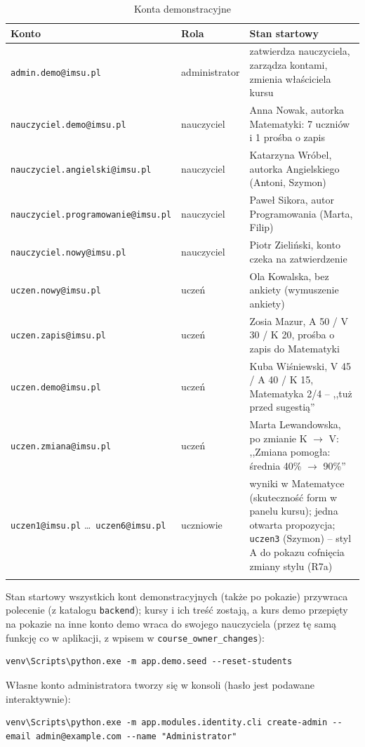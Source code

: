 \begingroup
\small
\begin{longtable}{|p{6.4cm}|p{2.4cm}|p{5.7cm}|}
\hline
\textbf{Konto} & \textbf{Rola} & \textbf{Stan startowy} \\ \hline
\endhead
\texttt{admin.demo@imsu.pl} & administrator & zatwierdza nauczyciela, zarządza kontami, zmienia właściciela kursu \\ \hline
\texttt{nauczyciel.demo@imsu.pl} & nauczyciel & Anna Nowak, autorka Matematyki: 7 uczniów i 1 prośba o zapis \\ \hline
\texttt{nauczyciel.angielski@imsu.pl} & nauczyciel & Katarzyna Wróbel, autorka Angielskiego (Antoni, Szymon) \\ \hline
\texttt{nauczyciel.programowanie@imsu.pl} & nauczyciel & Paweł Sikora, autor Programowania (Marta, Filip) \\ \hline
\texttt{nauczyciel.nowy@imsu.pl} & nauczyciel & Piotr Zieliński, konto czeka na zatwierdzenie \\ \hline
\texttt{uczen.nowy@imsu.pl} & uczeń & Ola Kowalska, bez ankiety (wymuszenie ankiety) \\ \hline
\texttt{uczen.zapis@imsu.pl} & uczeń & Zosia Mazur, A 50 / V 30 / K 20, prośba o zapis do Matematyki \\ \hline
\texttt{uczen.demo@imsu.pl} & uczeń & Kuba Wiśniewski, V 45 / A 40 / K 15, Matematyka 2/4 -- ,,tuż przed sugestią'' \\ \hline
\texttt{uczen.zmiana@imsu.pl} & uczeń & Marta Lewandowska, po zmianie K $\to$ V: ,,Zmiana pomogła: średnia 40\% $\to$ 90\%'' \\ \hline
\texttt{uczen1@imsu.pl} \ldots\ \texttt{uczen6@imsu.pl} & uczniowie & wyniki w Matematyce (skuteczność form w panelu kursu); jedna otwarta propozycja; \texttt{uczen3} (Szymon) -- styl A do pokazu cofnięcia zmiany stylu (R7a) \\ \hline
\caption{Konta demonstracyjne}
\end{longtable}
\endgroup

Stan startowy wszystkich kont demonstracyjnych (także po pokazie) przywraca polecenie (z katalogu \texttt{backend}); kursy i ich treść zostają, a kurs demo przepięty na pokazie na inne konto demo wraca do swojego nauczyciela (przez tę samą funkcję co w aplikacji, z wpisem w \texttt{course\_owner\_changes}):
\begin{lstlisting}
venv\Scripts\python.exe -m app.demo.seed --reset-students
\end{lstlisting}

Własne konto administratora tworzy się w konsoli (hasło jest podawane interaktywnie):
\begin{lstlisting}
venv\Scripts\python.exe -m app.modules.identity.cli create-admin --email admin@example.com --name "Administrator"
\end{lstlisting}

